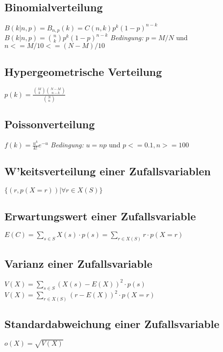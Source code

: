 \subsection{Binomialverteilung}
$ B(k|n, p) = B_{n,p}(k) = C(n, k) p^k (1-p)^{n-k} $
\newline
$ B(k|n, p) = \binom{n}{k} p^k (1-p)^{n-k} $
\newline
\newline
\textit{Bedingung:}
\newline
$ p = M/N $ und $ n <= M/10 <= (N - M) / 10 $

\subsection{Hypergeometrische Verteilung}
$ p(k) = \frac{\binom{M}{k} \binom{N-M}{n-k}}{\binom{N}{n}} $

\subsection{Poissonverteilung}
$ f(k) = \frac{u^k}{k!} e^{-u} $
\newline
\newline
\textit{Bedingung:}
\newline
$ u = np $ und $ p <= 0.1, n >= 100 $

\subsection{W'keitsverteilung einer Zufallsvariablen}
$ \{ (r, p(X = r)) | \forall r \in X(S) \} $

\subsection{Erwartungswert einer Zufallsvariable}
$ E(C) = \sum_{s \in S} X(s) \cdot p(s) = \sum_{r \in X(S)} r \cdot p(X = r) $

\subsection{Varianz einer Zufallsvariable}
$ V(X) = \sum_{s \in S} (X(s) - E(X))^2 \cdot p(s) $ 
\newline 
 $ V(X) = \sum_{r \in X(S)} (r - E(X))^2 \cdot p(X = r) $

\subsection{Standardabweichung einer Zufallsvariable}
$ o(X) = \sqrt{V(X)} $
